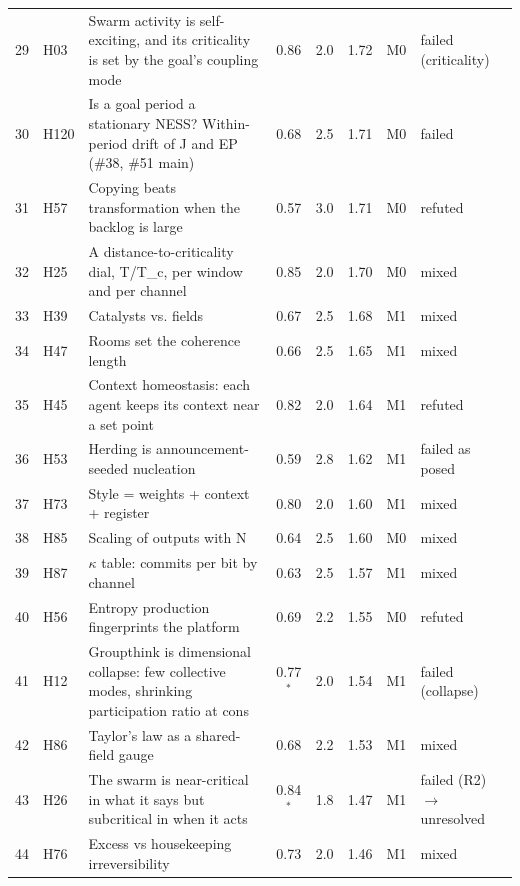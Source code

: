 \begin{table}[p]
\begin{tabular}{@{}r l p{} c c c c l@{}}
29 & H03 & Swarm activity is self-exciting, and its criticality is set by the goal's coupling mode & 0.86 & 2.0 & 1.72 & M0 & failed (criticality)\\
30 & H120 & Is a goal period a stationary NESS? Within-period drift of J and EP (\#38, \#51 main) & 0.68 & 2.5 & 1.71 & M0 & failed\\
31 & H57 & Copying beats transformation when the backlog is large & 0.57 & 3.0 & 1.71 & M0 & refuted\\
32 & H25 & A distance-to-criticality dial, T/T\_c, per window and per channel & 0.85 & 2.0 & 1.70 & M0 & mixed\\
33 & H39 & Catalysts vs. fields & 0.67 & 2.5 & 1.68 & M1 & mixed\\
34 & H47 & Rooms set the coherence length & 0.66 & 2.5 & 1.65 & M1 & mixed\\
35 & H45 & Context homeostasis: each agent keeps its context near a set point & 0.82 & 2.0 & 1.64 & M1 & refuted\\
36 & H53 & Herding is announcement-seeded nucleation & 0.59 & 2.8 & 1.62 & M1 & failed as posed\\
37 & H73 & Style = weights + context + register & 0.80 & 2.0 & 1.60 & M1 & mixed\\
38 & H85 & Scaling of outputs with N & 0.64 & 2.5 & 1.60 & M0 & mixed\\
39 & H87 & $\kappa$ table: commits per bit by channel & 0.63 & 2.5 & 1.57 & M1 & mixed\\
40 & H56 & Entropy production fingerprints the platform & 0.69 & 2.2 & 1.55 & M0 & refuted\\
41 & H12 & Groupthink is dimensional collapse: few collective modes, shrinking participation ratio at cons & 0.77$^\ast$ & 2.0 & 1.54 & M1 & failed (collapse)\\
42 & H86 & Taylor's law as a shared-field gauge & 0.68 & 2.2 & 1.53 & M1 & mixed\\
43 & H26 & The swarm is near-critical in what it says but subcritical in when it acts & 0.84$^\ast$ & 1.8 & 1.47 & M1 & failed (R2) $\to$ unresolved\\
44 & H76 & Excess vs housekeeping irreversibility & 0.73 & 2.0 & 1.46 & M1 & mixed\\
\bottomrule
\end{tabular}
\end{table}

